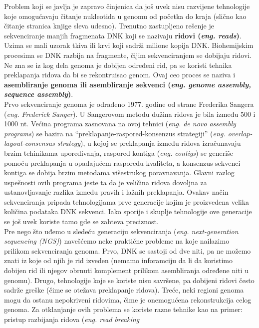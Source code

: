 \documentclass[a4paper]{article}
\begin{document}
{Problem koji se javlja je zapravo činjenica da još uvek nisu razvijene tehnologije koje omogućavaju čitanje nukleotida u genomu od početka do kraja (slično kao čitanje stranica knjige sleva udesno). Trenutno zastupljeno rešenje je sekvenciranje manjih fragmenata DNK koji se nazivaju \textbf{ridovi (\textit{eng. reads})}. Uzima se mali uzorak tkiva ili krvi koji sadrži milione kopija DNK. Biohemijskim procesima se DNK razbija na fragmente, čijim sekvenciranjem se dobijaju ridovi. Ne zna se iz kog dela genoma je dobijen određeni rid, pa se koristi tehnika preklapanja ridova da bi se rekontruisao genom. Ovaj ceo proces se naziva i \textbf{asembliranje genoma ili asembliranje sekvenci (\textit{eng. genome assembly, sequence assembly})}. \\
\indent Prvo sekvenciranje genoma je odrađeno 1977. godine od strane Frederika Sangera (\textit{eng. Frederick Sanger}). U Sangerovom metodu dužina ridova je bila između 500 i 1000 nt. Većina programa zasnovana na ovoj tehnici (\textit{eng. de novo assembly programs}) se bazira na ``preklapanje-raspored-konsenzus strategiji''  (\textit{eng. overlap-layout-consensus strategy}), u kojoj se preklapanja između ridova izračunavaju brzim tehinikama upore\-đivanja, raspored kontiga (\textit{eng. contigs}) se generiše pomoću preklapanja u opadajućem rasporedu kvaliteta, a konsenzus sekvenci kontiga se dobija brzim metodama višestrukog poravnavanja. Glavni razlog uspešnosti ovih programa jeste ta da je veličina ridova dovoljna za ustanovljavanje razlika između pravih i lažnih preklapanja. Ovakav način sekvenciranja pripada tehnologijama prve generacije kojim je proizvedena velika količina podataka DNK sekvenci. Iako sporije i skuplje tehnologije ove generacije se još uvek koriste tamo gde se zahteva preciznost.\\
\indent Pre nego što uđemo u sledeću generaciju sekvenciranja (\textit{eng. next-generation sequencing (NGS)}) navešćemo neke praktične probleme na koje nailazimo prilikom sekvenciranja genoma. Prvo, DNK se sastoji od dve niti, pa ne možemo znati iz koje od njih je rid izveden (nemamo inforamciju da li da koristimo dobijen rid ili njegov obrnuti komplement prilikom asembliranja određene niti u genomu). Drugo, tehnologije koje se koriste nisu savršene, pa dobijeni ridovi često sadrže greške (čime se otežava preklapanje ridova). Treće, neki regioni genoma mogu da ostanu nepokriveni ridovima, čime je onemogućena rekonstrukcija celog genoma. Za otklanjanje ovih problema se koriste razne tehnike kao na primer: pristup razbijanja ridova (\textit{eng. read breaking 
}}
\end{document}
